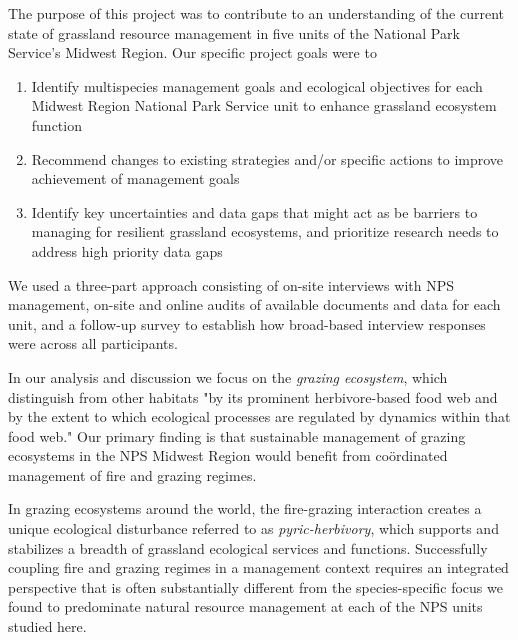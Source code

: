 The purpose of this project was to contribute to an understanding of the current state of grassland resource management in five units of the National Park Service's Midwest Region. 
Our specific project goals were to

\begin{enumerate}
	\item Identify multi\textendash species management goals and ecological objectives for each Midwest Region National Park Service unit to enhance grassland ecosystem function
	\item 	Recommend changes to existing strategies and/or specific actions to improve achievement of management goals 
	\item Identify key uncertainties and data gaps that might act as be barriers to managing for resilient grassland ecosystems, and prioritize research needs to address high priority data gaps
\end{enumerate}

We used a three-part approach consisting of on-site interviews with NPS management, on-site and online audits of available documents and data for each unit, and a follow-up survey to establish how broad-based interview responses were across all participants. 

In our analysis and discussion we focus on the \emph{grazing ecosystem}, which \citet{frank1998} distinguish from other habitats "by its prominent herbivore-based food web and by the extent to which ecological processes are regulated by dynamics within that food web." 
Our primary finding is that sustainable management of grazing ecosystems in the NPS Midwest Region would benefit from co\"{o}rdinated management of fire and grazing regimes. 

In grazing ecosystems around the world, the fire-grazing interaction creates a unique ecological disturbance referred to as \emph{pyric-herbivory}, which supports and stabilizes a breadth of grassland ecological services and functions. 
Successfully coupling fire and grazing regimes in a management context requires an integrated perspective that is often substantially different from the species-specific focus we found to predominate natural resource management at each of the NPS units studied here. 

